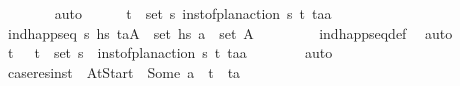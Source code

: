 \begin{isabellebody}
\ \ \ \ \ \ \isamarkupfalse%
\ auto\isanewline
\ \ \ \ \isamarkupfalse%
\ {\isachardoublequoteopen}{\isasymexists}{\isacharparenleft}{\kern0pt}t\isactrlsub {\isasympi}{\isacharcomma}{\kern0pt}{\isasympi}{\isacharparenright}{\kern0pt}\ {\isasymin}\ set\ {\isasympi}s{\isachardot}{\kern0pt}\ inst{\isacharunderscore}{\kern0pt}of{\isacharunderscore}{\kern0pt}plan{\isacharunderscore}{\kern0pt}action\ {\isasympi}s\ {\isacharparenleft}{\kern0pt}t\isactrlsub {\isasympi}{\isacharcomma}{\kern0pt}{\isasympi}{\isacharparenright}{\kern0pt}\ {\isacharparenleft}{\kern0pt}t\isactrlsub a{\isacharcomma}{\kern0pt}a{\isacharparenright}{\kern0pt}{\isachardoublequoteclose}\isanewline
\ \ \ \ \ \ \isamarkupfalse%
\ {\isacartoucheopen}ind{\isacharunderscore}{\kern0pt}happ{\isacharunderscore}{\kern0pt}seq\ {\isasympi}s\ hs\ {\isacartoucheopen}{\isacharparenleft}{\kern0pt}t\isactrlsub a{\isacharcomma}{\kern0pt}A{\isacharparenright}{\kern0pt}\ {\isasymin}\ set\ hs\ {\isacartoucheopen}a\ {\isasymin}\ set\ A{\isacartoucheclose}\ \isanewline
\ \ \ \ \ \ \isamarkupfalse%
\ ind{\isacharunderscore}{\kern0pt}happ{\isacharunderscore}{\kern0pt}seq{\isacharunderscore}{\kern0pt}def\ \isamarkupfalse%
\ auto\isanewline
\ \ \ \ \isamarkupfalse%
\ \isamarkupfalse%
\ t\isactrlsub {\isasympi}\ {\isasympi}\ \ {\isachardoublequoteopen}{\isacharparenleft}{\kern0pt}t\isactrlsub {\isasympi}{\isacharcomma}{\kern0pt}{\isasympi}{\isacharparenright}{\kern0pt}\ {\isasymin}\ set\ {\isasympi}s{\isachardoublequoteclose}\ \ {\isachardoublequoteopen}inst{\isacharunderscore}{\kern0pt}of{\isacharunderscore}{\kern0pt}plan{\isacharunderscore}{\kern0pt}action\ {\isasympi}s\ {\isacharparenleft}{\kern0pt}t\isactrlsub {\isasympi}{\isacharcomma}{\kern0pt}{\isasympi}{\isacharparenright}{\kern0pt}\ {\isacharparenleft}{\kern0pt}t\isactrlsub a{\isacharcomma}{\kern0pt}a{\isacharparenright}{\kern0pt}{\isachardoublequoteclose}\isanewline
\ \ \ \ \ \ \isamarkupfalse%
\ auto\isanewline
\ \ \ \ \isamarkupfalse%
\ {\isacharquery}{\kern0pt}case{}{\isacharequal}{\kern0pt}{\isachardoublequoteopen}res{\isacharunderscore}{\kern0pt}inst\ {\isasympi}\ At{\isacharunderscore}{\kern0pt}Start\ {\isacharequal}{\kern0pt}\ Some\ a\ {\isasymand}\ t\isactrlsub {\isasympi}\ {\isacharequal}{\kern0pt}\ t\isactrlsub a{\isachardoublequoteclose}\isanewline

\end{isabellebody}
